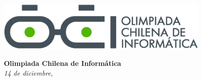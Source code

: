 \documentclass[12pt]{oci}
\begin{document}
  \begin{center}
  \includegraphics[height=70pt]{logo.eps}

  \vskip 70pt
  \Large{\bf Olimpiada Chilena de Inform\'atica\\ \the\year}
  \vskip 10pt
  \large{\phase}
  \vskip 10pt
  \normalsize{\it 14 de diciembre, \the\year}

  \vskip 85pt

\end{center} %
\end{document}
